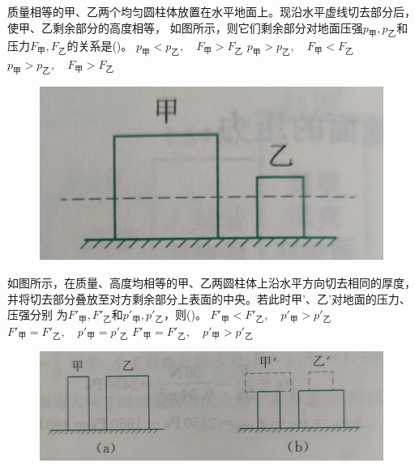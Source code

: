 \documentclass[a4paper,cs4size]{BHCexam}
\begin{document}
\begin{groups}
\begin{questions}[]
        \question[5] 质量相等的甲、乙两个均匀圆柱体放置在水平地面上。现沿水平虚线切去部分后，使甲、乙剩余部分的高度相等，
        如图所示，则它们剩余部分对地面压强$p_{\text{甲}},p_{\text{乙}}$和压力$F_{\text{甲}},F_{\text{乙}}$的关系是(\quad\quad\quad)。
        {$p_{\text{甲}}<p_{\text{乙}},\quad F_{\text{甲}}>F_{\text{乙}}$}
        {$p_{\text{甲}}>p_{\text{乙}},\quad F_{\text{甲}}<F_{\text{乙}}$}
        {$p_{\text{甲}}>p_{\text{乙}},\quad F_{\text{甲}}>F_{\text{乙}}$}
        \begin{figure}[htb]
            \flushright
            \includegraphics [scale=0.4,trim=0 0 0 0]{./image/physics_pressure_2.png}
            \label{fig:fig_pressure_2}
        \end{figure}
        \vspace{5cm}

        \question[5] 如图所示，在质量、高度均相等的甲、乙两圆柱体上沿水平方向切去相同的厚度，
        并将切去部分叠放至对方剩余部分上表面的中央。若此时甲'、乙'对地面的压力、压强分别
        为$F'_{\text{甲}},F'_{\text{乙}}$和$p'_{\text{甲}},p'_{\text{乙}}$，则(\quad\quad\quad)。
        {$F'_{\text{甲}}<F'_{\text{乙}},\quad p'_{\text{甲}}>p'_{\text{乙}}$}
        {$F'_{\text{甲}}=F'_{\text{乙}},\quad p'_{\text{甲}}=p'_{\text{乙}}$}
        {$F'_{\text{甲}}=F'_{\text{乙}},\quad p'_{\text{甲}}>p'_{\text{乙}}$}
        \begin{figure}[htb]
            \flushright
            \includegraphics [scale=0.4,trim=0 0 0 0]{./image/physics_pressure_3.png}
            \label{fig:fig_pressure_3}
        \end{figure}
        \vspace{5cm}


\end{questions}
\end{groups}
\end{document}
